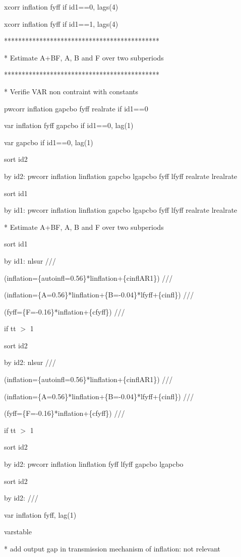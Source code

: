 \documentclass[12pt,a4paper]{article}%
\begin{document}
xcorr inflation fyff if id1==0, lags(4)

xcorr inflation fyff if id1==1, lags(4)

********************************************

* Estimate A+BF, A, B and F over two subperiods

********************************************

* Verifie VAR non contraint with constants

pwcorr inflation gapcbo fyff realrate if id1==0

var inflation fyff gapcbo if id1==0, lag(1)

var gapcbo if id1==0, lag(1)

sort id2

by id2: pwcorr inflation linflation gapcbo lgapcbo fyff lfyff realrate lrealrate

sort id1

by id1: pwcorr inflation linflation gapcbo lgapcbo fyff lfyff realrate lrealrate

* Estimate A+BF, A, B and F over two subperiods

sort id1

by id1: nlsur ///

(inflation=\{autoinfl=0.56\}*linflation+\{cinflAR1\}) ///

(inflation=\{A=0.56\}*linflation+\{B=-0.04\}*lfyff+\{cinfl\}) ///

(fyff=\{F=-0.16\}*inflation+\{cfyff\}) ///

if tt%
$>$%
1

sort id2

by id2: nlsur ///

(inflation=\{autoinfl=0.56\}*linflation+\{cinflAR1\}) ///

(inflation=\{A=0.56\}*linflation+\{B=-0.04\}*lfyff+\{cinfl\}) ///

(fyff=\{F=-0.16\}*inflation+\{cfyff\}) ///

if tt%
$>$%
1

sort id2

by id2: pwcorr inflation linflation fyff lfyff gapcbo lgapcbo

sort id2

by id2: ///

var inflation fyff, lag(1)

varstable

* add output gap in transmission mechanism of inflation: not relevant
\end{document}
